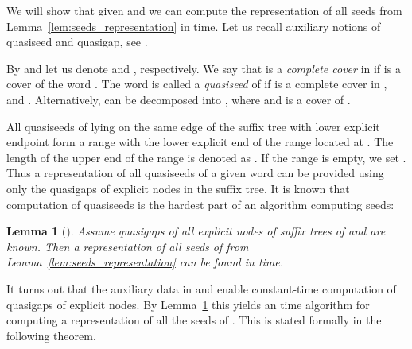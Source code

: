 \documentclass{article}
\theoremstyle{theorem}
\newtheorem{lemma}{Lemma}
\theoremstyle{definition}
\begin{document}
  We will show that given  and  we can compute the representation
  of all seeds from Lemma~\ref{lem:seeds_representation} in  time.
  Let us recall auxiliary notions of quasiseed and quasigap, see \cite{DBLP:conf/soda/KociumakaKRRW12}.

  By  and  let us denote  and , respectively.
  We say that  is a \emph{complete cover} in  if  is a cover of
  the word .
  The word  is called a \textit{quasiseed} of  if  is a complete cover in ,
   and .
  Alternatively,  can be decomposed into , where  and  is a cover of .

  All quasiseeds of  lying on the same edge of the suffix tree with lower explicit endpoint 
  form a range with the lower explicit end of the range located at .
  The length of the upper end of the range is denoted as .
  If the range is empty, we set .
  Thus a representation of all quasiseeds of a given word can be provided using only 
  the quasigaps of explicit nodes in the suffix tree.
  It is known that computation of quasiseeds is the hardest part of an algorithm computing seeds:

  \begin{lemma}[\cite{DBLP:journals/algorithmica/IliopoulosMP96,DBLP:conf/soda/KociumakaKRRW12}]\label{lem:quasigaps}
    Assume quasigaps of all explicit nodes of suffix trees of  and  are known.
    Then a representation of all seeds of  from Lemma~\ref{lem:seeds_representation}
    can be found in  time.
  \end{lemma}

  It turns out that the auxiliary data in  and  enable constant-time computation
  of quasigaps of explicit nodes.
  By Lemma~\ref{lem:quasigaps} this yields an  time algorithm for computing a representation
  of all the seeds of .
  This is stated formally in the following theorem.
\end{document}
